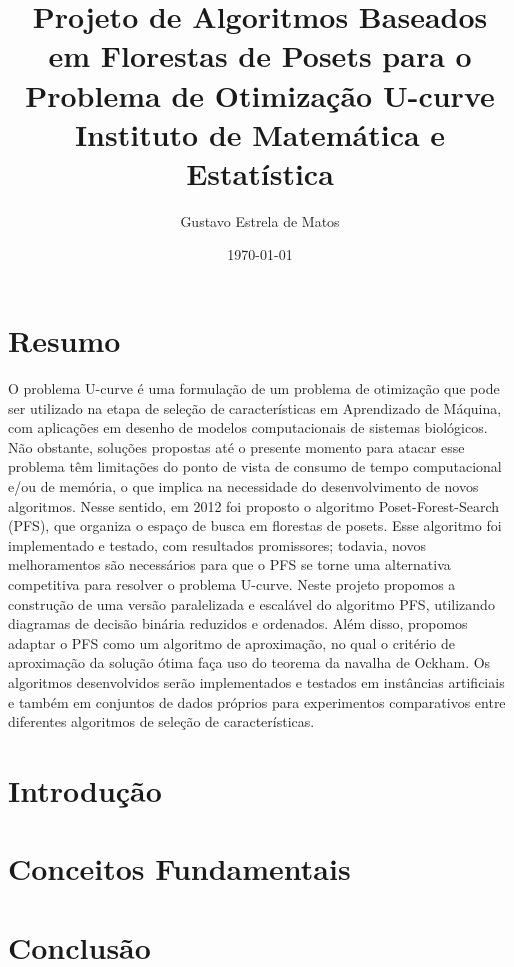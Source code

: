 \documentclass[12pt, twoside]{report}
\title{
    {Projeto de Algoritmos Baseados em Florestas de Posets para o 
     Problema de Otimização U-curve} \\
    {\large Instituto de Matemática e Estatística} \\
}
\author{Gustavo Estrela de Matos}
\date{\today}
\numberwithin{mydefinition}{section}
\begin{document}
\maketitle

\chapter*{Resumo}
O problema U-curve é uma formulação de um problema de otimização que 
pode ser utilizado na etapa de seleção de características em Aprendizado
de Máquina, com aplicações em desenho de modelos computacionais de 
sistemas biológicos. Não obstante, soluções propostas até o presente 
momento para atacar esse problema têm limitações do ponto de vista de 
consumo de tempo computacional e/ou de memória, o que implica na 
necessidade do desenvolvimento de novos algoritmos. Nesse sentido, em 
2012 foi proposto o algoritmo Poset-Forest-Search (PFS), que organiza o
espaço de busca em florestas de posets. Esse algoritmo foi implementado 
e testado, com resultados promissores; todavia, novos melhoramentos são
necessários para que o PFS se torne uma alternativa competitiva para 
resolver o problema U-curve. Neste projeto propomos a construção de uma 
versão paralelizada e escalável do algoritmo PFS, utilizando diagramas 
de decisão binária reduzidos e ordenados. Além disso, propomos adaptar 
o PFS como um algoritmo de aproximação, no qual o critério de 
aproximação da solução ótima faça uso do teorema da navalha de Ockham. 
Os algoritmos desenvolvidos serão implementados e testados em instâncias
artificiais e também em conjuntos de dados próprios para experimentos 
comparativos entre diferentes algoritmos de seleção de características.

\tableofcontents

\nocite{*}
\chapter{Introdução}


\chapter{Conceitos Fundamentais}


\chapter{Conclusão}


\newpage
\printbibliography
\end{document}
